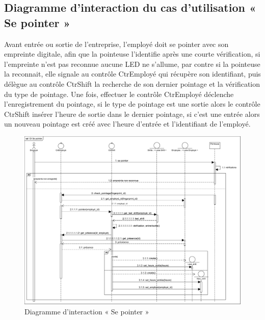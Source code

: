 \begin{itemize}
    \subsection*{Diagramme d'interaction du cas d'utilisation « Se pointer »}
   Avant entrée ou sortie de l’entreprise, l’employé doit se pointer avec son empreinte digitale, afin que la pointeuse l’identifie après une courte vérification, si l’empreinte n’est pas reconnue aucune LED ne s’allume, par contre si la pointeuse la reconnait, elle signale au contrôle CtrEmployé qui récupère son identifiant, puis délègue au contrôle CtrShift la recherche de son dernier pointage et la vérification du type de pointage. Une fois, effectuer le contrôle CtrEmployé déclenche l’enregistrement du pointage, si le type de pointage est une sortie alors le contrôle CtrShift insérer l’heure de sortie dans le dernier pointage, si c’est une entrée alors un nouveau pointage est créé avec l’heure d’entrée et l’identifiant de l’employé. 
        \begin{figure}[h!]
                 \centering
                \includegraphics[scale=0.56]{images/DS/DI Se pointer.png}
                 \caption{Diagramme d'interaction « Se pointer »}
                 \label{fig34}
        \end{figure}
        
    \clearpage
    

\end{itemize}
